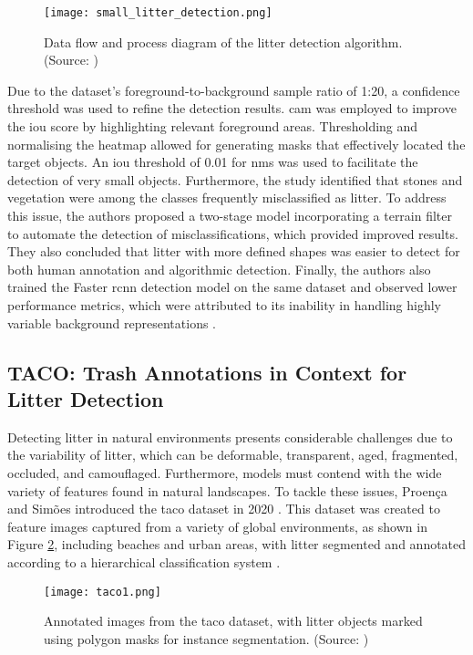 \begin{figure}[!htbp]
    \centering
    \texttt{[image: small\_litter\_detection.png]}
    \caption{Data flow and process diagram of the litter detection algorithm. (Source: \cite{small_litter_detection})}
    \label{fig:smalllitterdetection}
\end{figure}

Due to the dataset’s foreground-to-background sample ratio of 1:20, a confidence threshold was used to refine the detection results. \gls{cam} was employed to improve the \gls{iou} score by highlighting relevant foreground areas. Thresholding and normalising the heatmap allowed for generating masks that effectively located the target objects. An \gls{iou} threshold of 0.01 for \gls{nms} was used to facilitate the detection of very small objects.
Furthermore, the study identified that stones and vegetation were among the classes frequently misclassified as litter. To address this issue, the authors proposed a two-stage model incorporating a terrain filter to automate the detection of misclassifications, which provided improved results. They also concluded that litter with more defined shapes was easier to detect for both human annotation and algorithmic detection. 
Finally, the authors also trained the Faster \gls{rcnn} detection model on the same dataset and observed lower performance metrics, which were attributed to its inability in handling highly variable background representations \cite{small_litter_detection}.

\subsection{TACO: Trash Annotations in Context for Litter Detection}
\label{subsec:3_tacodataset}

Detecting litter in natural environments presents considerable challenges due to the variability of litter, which can be deformable, transparent, aged, fragmented, occluded, and camouflaged. Furthermore, models must contend with the wide variety of features found in natural landscapes. To tackle these issues, Proença and Simões introduced the \gls{taco} dataset in 2020 \cite{taco2020}. This dataset was created to feature images captured from a variety of global environments, as shown in Figure \ref{fig:taco1}, including beaches and urban areas, with litter segmented and annotated according to a hierarchical classification system \cite{taco2020}.

\begin{figure}[!htbp]
    \centering
    \texttt{[image: taco1.png]}
    \caption{Annotated images from the \gls{taco} dataset, with litter objects marked using polygon masks for instance segmentation. (Source: \cite{taco2020})}
    \label{fig:taco1}
\end{figure}

